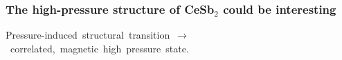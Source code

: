 \begin{frame}[plain]
    \frametitle{The high-pressure structure of CeSb$_2$ could be interesting}
      \mbox{\small Pressure-induced structural transition $\rightarrow$ correlated, magnetic high pressure state. }
\end{frame}
    

    


